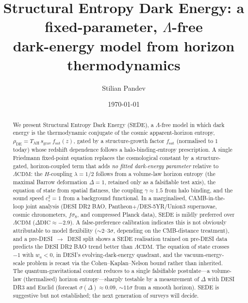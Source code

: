 \documentclass[aps,prd,reprint,nofootinbib,superscriptaddress]{revtex4-2}
\newcommand{\rhoDE}{\rho_{\mathrm{DE}}}
\newcommand{\TAH}{T_{\mathrm{AH}}}
\newcommand{\sgrav}{s_{\mathrm{grav}}}
\newcommand{\fsat}{f_{\mathrm{sat}}}
\newcommand{\LCDM}{\Lambda\mathrm{CDM}}
\begin{document}
\title{Structural Entropy Dark Energy: a fixed-parameter, $\Lambda$-free\\ dark-energy model from horizon thermodynamics}
\author{Stilian Pandev}
\date{\today}

\begin{abstract}
We present Structural Entropy Dark Energy (SEDE), a $\Lambda$-free model in which dark energy is the
thermodynamic conjugate of the cosmic apparent-horizon entropy, $\rhoDE=\TAH\,\sgrav\,\fsat(z)$, gated
by a structure-growth factor $\fsat$ (normalised to $1$ today) whose redshift dependence follows a
halo-binding-entropy prescription. A single Friedmann fixed-point equation replaces the cosmological
constant by a structure-gated, horizon-coupled term that adds \emph{no fitted dark-energy parameter}
relative to $\LCDM$: the $H$-coupling $\lambda=1/2$ follows from a volume-law horizon entropy (the
maximal Barrow deformation $\Delta=1$, retained only as a falsifiable test axis), the equation of state
from spatial flatness, the coupling $\gamma\approx1.5$ from halo binding, and the sound speed
$c_s^2=1$ from a background functional. In a marginalised, CAMB-in-the-loop joint analysis (DESI DR2
BAO, Pantheon$+$/DES-5YR/Union3 supernovae, cosmic chronometers, $f\sigma_8$, and compressed Planck
data), SEDE is mildly preferred over $\LCDM$ ($\Delta\mathrm{DIC}\approx-2.9$). A false-preference
calibration indicates this is not obviously attributable to model flexibility ($\sim2$--$3\sigma$,
depending on the CMB-distance treatment), and a pre-DESI~$\to$~DESI split shows a SEDE realisation
trained on pre-DESI data predicts the DESI DR2 BAO trend better than $\LCDM$. The equation of state
crosses $-1$ with $w_a<0$, in DESI's evolving-dark-energy quadrant, and the vacuum-energy-scale problem
is recast via the Cohen--Kaplan--Nelson bound rather than inherited. The quantum-gravitational content
reduces to a single falsifiable postulate---a volume-law (thermalised) horizon entropy---sharply
testable by a measurement of $\Delta$ with DESI DR3 and Euclid (forecast $\sigma(\Delta)\approx0.09$,
$\sim11\sigma$ from a smooth horizon). SEDE is suggestive but not established; the next generation of
surveys will decide.
\end{abstract}
\maketitle





\end{document}
